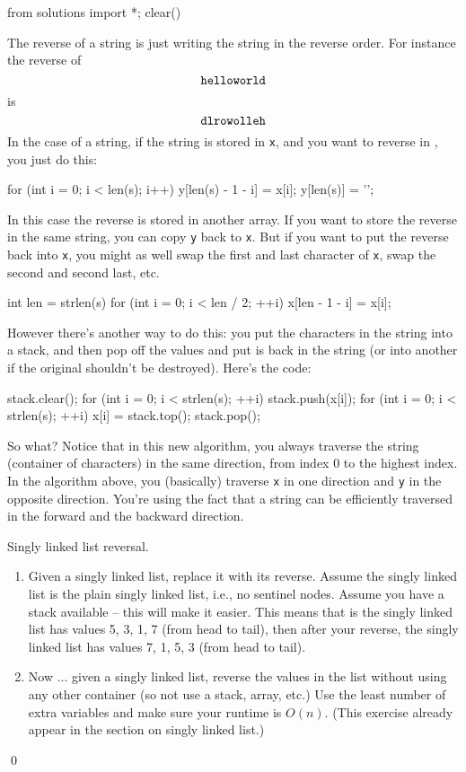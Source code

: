 \begin{python0}
from solutions import *; clear()
\end{python0}

The reverse of a string is just writing the string in the reverse order.
For instance the reverse of
\[
\text{\texttt{helloworld}}
\]
is
\[
\text{\texttt{dlrowolleh}}
\]
In the case of a string, if the string is stored in \verb!x!, and you want to reverse
in , you just do this:
\begin{console}
for (int i = 0; i < len(s); i++)
{
    y[len(s) - 1 - i] = x[i];
}
y[len(s)] = '\0';
\end{console}
In this case the reverse is stored in another array.
If you want to store the reverse in the same string, you can copy \verb!y! back to
\verb!x!.
But if you want to put the reverse back into \verb!x!,
you might as well swap the first and last character of \verb!x!,
swap the second and second last, etc.
\begin{console}
int len = strlen(s)
for (int i = 0; i < len / 2; ++i)
{
    x[len - 1 - i] = x[i];
}
\end{console}

However there's another way to do this:
you put the characters in the string into a stack, and then pop off the values
and put is back in the string (or into another if the original shouldn't be
destroyed).
Here's the code:
\begin{console}
stack.clear();
for (int i = 0; i < strlen(s); ++i)
{
    stack.push(x[i]);
}
for (int i = 0; i < strlen(s); ++i)
{
    x[i] = stack.top();
    stack.pop();
}
\end{console}

So what?
Notice that in this new algorithm, you always traverse the string (container of
characters) in the same direction, from index 0 to the highest index.
In the algorithm above, you (basically) traverse \verb!x! in one direction
and \verb!y! in the opposite direction.
You're using the fact that a string can be efficiently traversed in the forward
and the backward direction.

\begin{ex}
  Singly linked list reversal.
  \begin{enumerate}[nosep]

  \item Given a singly linked list,
    replace it with its reverse.
    Assume the singly linked list is the plain singly linked list,
    i.e., no sentinel nodes.
    Assume you have a stack available -- this will make it easier.
    This means that is the singly linked list
    has values 5, 3, 1, 7 (from head to tail), then
    after your reverse, the singly linked list
    has values 7, 1, 5, 3 (from head to tail).

  \item Now ... given a singly linked list,
    reverse the values in the list without using
    any other container (so not use a stack, array, etc.)
    Use the least number of extra variables
    and make sure your runtime is $O(n)$.
    (This exercise already appear in the section on singly linked list.)
  \end{enumerate}
\qed
\end{ex}

